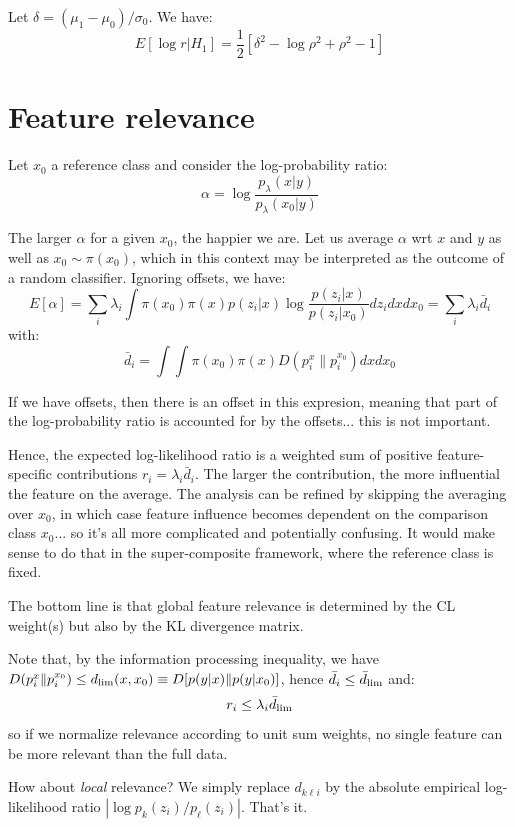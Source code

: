 \documentclass[english]{scrartcl}
\begin{document}
Let $\delta = (\mu_1-\mu_0)/\sigma_0$. We have:
$$
E[\log r | H_1] = 
\frac{1}{2}
\left[
\delta^2
- \log \rho^2
+ \rho^2  - 1
\right]
$$


\section{Feature relevance}

Let $x_0$ a reference class and consider the log-probability ratio:
$$
\alpha = \log \frac{p_\lambda(x|y)}{p_\lambda(x_0|y)}
$$

The larger $\alpha$ for a given $x_0$, the happier we are. Let us average $\alpha$ wrt $x$ and $y$ as well as $x_0\sim \pi(x_0)$, which in this context may be interpreted as the outcome of a random classifier. Ignoring offsets, we have:
$$
E[\alpha]
= \sum_i \lambda_i \int \pi(x_0)\pi(x) p(z_i|x) \log\frac{p(z_i|x)}{p(z_i|x_0)} dz_i dx dx_0
= \sum_i \lambda_i \bar{d}_i
$$
with:
$$
\bar{d}_i =
\int \int \pi(x_0) \pi(x) D(p_i^x\|p_i^{x_0}) dx dx_0
$$

If we have offsets, then there is an offset in this expresion, meaning that part of the log-probability ratio is accounted for by the offsets... this is not important.

Hence, the expected log-likelihood ratio is a weighted sum of positive feature-specific contributions $r_i=\lambda_i \bar{d}_i$. The larger the contribution, the more influential the feature on the average. The analysis can be refined by skipping the averaging over $x_0$, in which case feature influence becomes dependent on the comparison class $x_0$... so it's all more complicated and potentially confusing. It would make sense to do that in the super-composite framework, where the reference class is fixed.

The bottom line is that global feature relevance is determined by the CL weight(s) but also by the KL divergence matrix. 

Note that, by the information processing inequality, we have $D(p_i^x\|p_i^{x_0}) \leq d_{\rm lim}(x,x_0)\equiv D[p(y|x)\|p(y|x_0)]$, hence $\bar{d}_i\leq \bar{d}_{\rm lim}$ and:
$$
r_i \leq \lambda_i \bar{d}_{\rm lim}
$$
so if we normalize relevance according to unit sum weights, no single feature can be more relevant than the full data. 

How about {\em local} relevance? We simply replace $d_{k\ell i}$ by the absolute empirical log-likelihood ratio $|\log p_k(z_i)/p_\ell(z_i)|$. That's it.




\end{document}
